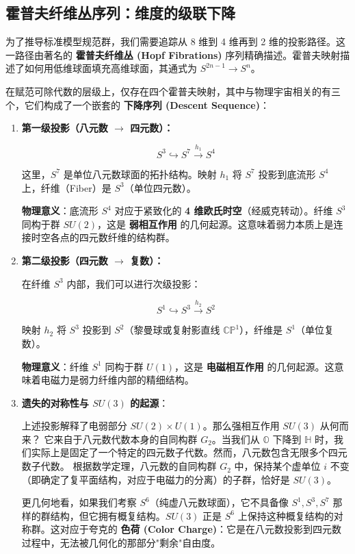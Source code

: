 \subsection{霍普夫纤维丛序列：维度的级联下降}

为了推导标准模型规范群，我们需要追踪从 8 维到 4 维再到 2 维的投影路径。这一路径由著名的 \textbf{霍普夫纤维丛 (Hopf Fibrations)} 序列精确描述。霍普夫映射描述了如何用低维球面填充高维球面，其通式为 $S^{2n-1} \to S^n$。

在赋范可除代数的层级上，仅存在四个霍普夫映射，其中与物理宇宙相关的有三个，它们构成了一个嵌套的 \textbf{下降序列 (Descent Sequence)}：

\begin{enumerate}
\item \textbf{第一级投影（八元数 $\to$ 四元数）：}

\[S^3 \hookrightarrow S^7 \xrightarrow{h_1} S^4\]

这里，$S^7$ 是单位八元数球面的拓扑结构。映射 $h_1$ 将 $S^7$ 投影到底流形 $S^4$ 上，纤维（Fiber）是 $S^3$（单位四元数）。

\textbf{物理意义}：底流形 $S^4$ 对应于紧致化的 \textbf{4 维欧氏时空}（经威克转动）。纤维 $S^3$ 同构于群 $SU(2)$，这是 \textbf{弱相互作用} 的几何起源。这意味着弱力本质上是连接时空各点的四元数纤维的结构群。

\item \textbf{第二级投影（四元数 $\to$ 复数）：}

在纤维 $S^3$ 内部，我们可以进行次级投影：

\[S^1 \hookrightarrow S^3 \xrightarrow{h_2} S^2\]

映射 $h_2$ 将 $S^3$ 投影到 $S^2$（黎曼球或复射影直线 $\mathbb{CP}^1$），纤维是 $S^1$（单位复数）。

\textbf{物理意义}：纤维 $S^1$ 同构于群 $U(1)$，这是 \textbf{电磁相互作用} 的几何起源。这意味着电磁力是弱力纤维内部的精细结构。

\item \textbf{遗失的对称性与 $SU(3)$ 的起源}：

上述投影解释了电弱部分 $SU(2) \times U(1)$。那么强相互作用 $SU(3)$ 从何而来？
它来自于八元数代数本身的自同构群 $G_2$。当我们从 $\mathbb{O}$ 下降到 $\mathbb{H}$ 时，我们实际上是固定了一个特定的四元数子代数。然而，八元数包含无限多个四元数子代数。
根据数学定理，八元数的自同构群 $G_2$ 中，保持某个虚单位 $i$ 不变（即确定了复平面结构，对应于电磁力的分离）的子群，恰好是 \textbf{$SU(3)$}。

更几何地看，如果我们考察 $S^6$（纯虚八元数球面），它不具备像 $S^1, S^3, S^7$ 那样的群结构，但它拥有概复结构。$SU(3)$ 正是 $S^6$ 上保持这种概复结构的对称群。这对应于夸克的 \textbf{色荷 (Color Charge)}：它是在八元数投影到四元数过程中，无法被几何化的那部分"剩余"自由度。
\end{enumerate}


